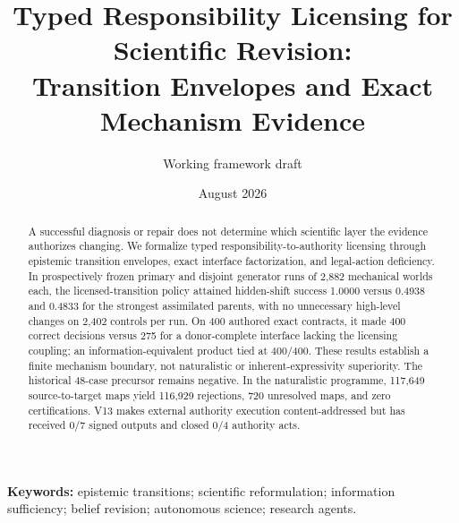 \documentclass[11pt]{article}
\title{Typed Responsibility Licensing for Scientific Revision:\\
Transition Envelopes and Exact Mechanism Evidence}
\author{Working framework draft}
\date{August 2026}
\gdef\pOneBibDatabases{bibliography,novelty_refresh_2026}
\begin{document}
\maketitle



\begin{abstract}
A successful diagnosis or repair does not determine which scientific layer the
evidence authorizes changing. We formalize typed responsibility-to-authority
licensing through epistemic transition envelopes, exact interface factorization,
and legal-action deficiency. In prospectively frozen primary and disjoint
generator runs of 2,882 mechanical worlds each, the licensed-transition policy
attained hidden-shift success 1.0000 versus 0.4938 and 0.4833 for the strongest
assimilated parents, with no unnecessary high-level changes on 2,402 controls
per run. On 400 authored exact contracts, it made 400 correct decisions versus
275 for a donor-complete interface lacking the licensing coupling; an
information-equivalent product tied at 400/400. These results establish a finite
mechanism boundary, not naturalistic or inherent-expressivity superiority. The
historical 48-case precursor remains negative. In the naturalistic programme,
117,649 source-to-target maps yield 116,929 rejections, 720 unresolved maps, and
zero certifications. V13 makes external authority execution content-addressed
but has received 0/7 signed outputs and closed 0/4 authority acts.
\end{abstract}

\noindent\textbf{Keywords:} epistemic transitions; scientific reformulation; information sufficiency; belief revision; autonomous science; research agents.



















\end{document}
